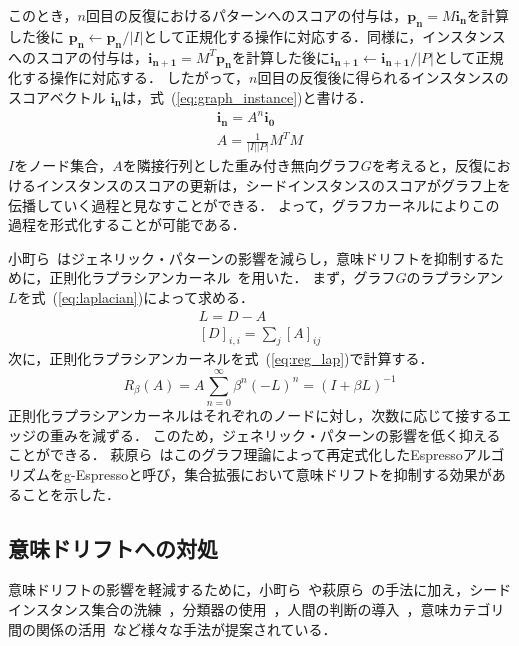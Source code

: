 \documentclass[japanese]{jnlp_1.4}
\begin{document}
このとき，$n$回目の反復におけるパターンへのスコアの付与は，$\boldsymbol{p_{n}} = M \boldsymbol{i_{n}}$を計算した後に $\boldsymbol{p_{n}} \gets \boldsymbol{p_{n}}/|I|$として正規化する操作に対応する．同様に，インスタンスへのスコアの付与は，$\boldsymbol{i_{n+1}} = M^{T} \boldsymbol{p_{n}}$を計算した後に$\boldsymbol{i_{n+1}} \gets \boldsymbol{i_{n+1}}/|P|$として正規化する操作に対応する．
したがって，$n$回目の反復後に得られるインスタンスのスコアベクトル $\boldsymbol{i_{n}}$は，式~(\ref{eq:graph_instance})と書ける．
\begin{gather}
 \boldsymbol{i_{n}} = A^{n} \boldsymbol{i_{0}}
	\label{eq:graph_instance} \\
 A = \frac{1}{|I||P|}M^{T}M
\end{gather}
$I$をノード集合，$A$を隣接行列とした重み付き無向グラフ$G$を考えると，反復におけるインスタンスのスコアの更新は，シードインスタンスのスコアがグラフ上を伝播していく過程と見なすことができる．
よって，グラフカーネルによりこの過程を形式化することが可能である．

小町ら~\cite{mamoru_komachi:2010}はジェネリック・パターンの影響を減らし，意味ドリフトを抑制するために，正則化ラプラシアンカーネル~\cite{b155}を用いた．
まず，グラフ$G$のラプラシアン$L$を式~(\ref{eq:laplacian})によって求める．
\begin{gather}
L = D - A
	\label{eq:laplacian}\\
[D]_{i,i} = \sum_{j}^{}[A]_{ij}
\end{gather}
次に，正則化ラプラシアンカーネルを式~(\ref{eq:reg_lap})で計算する．
\begin{equation}
R_{\beta}(A) = A\sum_{n=0}^{\infty}\beta^{n}(-L)^{n} = (I + \beta L)^{-1}
	\label{eq:reg_lap}
\end{equation}
正則化ラプラシアンカーネルはそれぞれのノードに対し，次数に応じて接するエッジの重みを減ずる．
このため，ジェネリック・パターンの影響を低く抑えることができる．
萩原ら~\cite{masato_hagiwara:2011}はこのグラフ理論によって再定式化したEspressoアルゴリズムをg-Espressoと呼び，集合拡張において意味ドリフトを抑制する効果があることを示した．



\subsection{意味ドリフトへの対処}

意味ドリフトの影響を軽減するために，小町ら~\cite{mamoru_komachi:2010}や萩原ら~\cite{masato_hagiwara:2011}の手法に加え，シードインスタンス集合の洗練~\cite{Vyas:2009:HEC:1645953.1645984}，分類器の使用~\cite{Bellare_lightlysupervisedattribute,Sadamitsu:2011:ESE:2002736.2002876,Pennacchiotti:2011:ABT:2018936.2018955}，人間の判断の導入~\cite{Vyas:2009:SES:1620754.1620796}，意味カテゴリ間の関係の活用~\cite{Curran_minimisingsemantic,carlson-wsdm}など様々な手法が提案されている．
\end{document}
